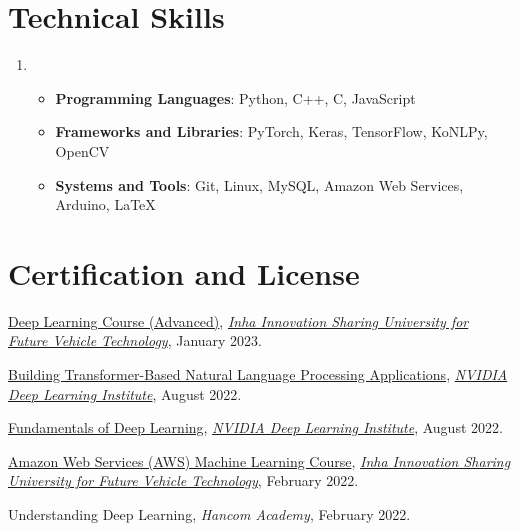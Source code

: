 \documentclass[letterpaper,11pt]{article}
\begin{document}
    \section{Technical Skills}
    \begin{enumerate}[noitemsep, leftmargin=*,label=]
        \item{
            \begin{itemize}[label=\bullet]
                \item{\textbf{Programming Languages}: Python, C++, C, JavaScript}
                \item{\textbf{Frameworks and Libraries}: PyTorch, Keras, TensorFlow, KoNLPy, OpenCV}
                \item{\textbf{Systems and Tools}: Git, Linux, MySQL, Amazon Web Services, Arduino, \LaTeX}
            \end{itemize}
        }
    \end{enumerate}
    
    \section{Certification and License}
    \begin{enumerate}[noitemsep, leftmargin=*,label={[\arabic*]}]
        \item{\href{https://user-images.githubusercontent.com/73745836/216896341-f17186c1-7883-4dc6-b2a5-5063e2fc5e80.jpeg}{Deep Learning Course (Advanced)}, \textit{\href{http://fvt.inha.ac.kr/}{Inha Innovation Sharing University for Future Vehicle Technology}}, January 2023.}
        \item{\href{https://courses.nvidia.com/certificates/3635de0b089446bb8e95c101b05518e4/}{Building Transformer-Based Natural Language Processing Applications}, \textit{\href{https://www.nvidia.com/en-us/training/}{NVIDIA Deep Learning Institute}}, August 2022.}
        \item{\href{https://courses.nvidia.com/certificates/825e75c11f3541fa9c196832ffa1db8d/}{Fundamentals of Deep Learning}, \textit{\href{https://www.nvidia.com/en-us/training/}{NVIDIA Deep Learning Institute}}, August 2022.}
        \item{\href{https://user-images.githubusercontent.com/73745836/163787775-86eb9285-5eeb-4539-aed0-0fb977c102ff.jpg}{Amazon Web Services (AWS) Machine Learning Course}, \textit{\href{http://fvt.inha.ac.kr/}{\href{https://user-images.githubusercontent.com/73745836/163787768-c1565a01-57f1-41e0-a436-44a214caaa38.jpg}{Inha Innovation Sharing University for Future Vehicle Technology}}}, February 2022.}
        \item{Understanding Deep Learning, \textit{Hancom Academy}, February 2022.}
    \end{enumerate}
\end{document}
